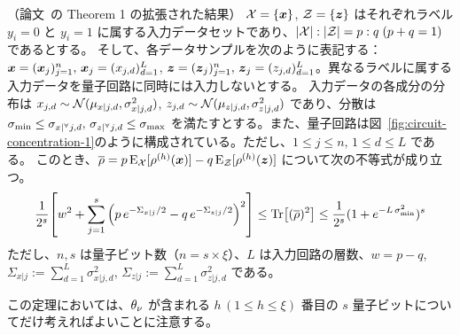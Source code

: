 \begin{screen}
    \begin{theorem}\label{thm:concentration-1}
        （論文~\cite{li2022concentration}の Theorem 1 の拡張された結果）
        $\mathcal{X} = \{\boldsymbol{x}\}$, $\mathcal{Z} = \{\boldsymbol{z}\}$ はそれぞれラベル $y_i=0$ と $y_i=1$ に属する入力データセットであり、$|\mathcal{X}|:|\mathcal{Z}| = p:q\;(p+q=1)$ であるとする。
        そして、各データサンプルを次のように表記する：$\boldsymbol{x} = (\boldsymbol{x}_{j})_{j=1}^n,\, \boldsymbol{x}_{j} = (x_{j,d})_{d=1}^L$, $\boldsymbol{z} = (\boldsymbol{z}_{j})_{j=1}^n,\, \boldsymbol{z}_{j} = (z_{j,d})_{d=1}^L$。異なるラベルに属する入力データを量子回路に同時には入力しないとする。
        入力データの各成分の分布は $x_{j,d} \sim \mathcal{N}(\mu_{x|j,d}, \sigma_{x|j,d}^2)$, $z_{j,d} \sim \mathcal{N}(\mu_{z|j,d}, \sigma_{z|j,d}^2)$ であり、分散は $\sigma_{\min} \leq \sigma_{x|{}^\forall j,d},\, \sigma_{z|{}^\forall j,d} \leq \sigma_{\max}$ を満たすとする。また、量子回路は図~\ref{fig:circuit-concentration-1}のように構成されている。ただし、$1\leq j\leq n,\, 1\leq d\leq L$ である。
        このとき、$\overline{\rho} = p\operatorname{E}_{\mathcal{X}}[\rho^{(h)}(\boldsymbol{x})] - q\operatorname{E}_{\mathcal{Z}}[\rho^{(h)}(\boldsymbol{z})]$ について次の不等式が成り立つ。
        \begin{align}
            \frac{1}{2^s}
            \qty[w^2 + \sum_{j=1}^s \qty(p\,e^{-\Sigma_{x|j}/2} - q\,e^{-\Sigma_{z|j}/2})^2]
            \leq \Tr[(\overline{\rho})^2]
            \leq \frac{1}{2^s} (1 + e^{-L\,\sigma_{\min}^2})^s
        \end{align}
        ただし、$n,s$ は量子ビット数（$n=s\times\xi$）、$L$ は入力回路の層数、$w = p - q$, $\Sigma_{x|j}:=\sum_{d=1}^L \sigma_{x|j,d}^2$, $\Sigma_{z|j}:=\sum_{d=1}^L \sigma_{z|j,d}^2$ である。
    \end{theorem}
\end{screen}
この定理においては、$\theta_\nu$ が含まれる $h\,(1\leq h\leq\xi)$ 番目の $s$ 量子ビットについてだけ考えればよいことに注意する。


